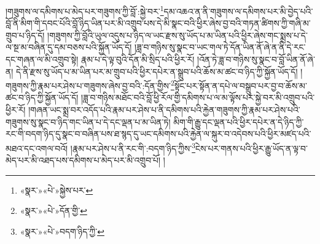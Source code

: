 །གཟུགས་ལ་དམིགས་པ་མེད་པར་གཟུགས་ཀྱི་བློ་:སྐྱེ་བར་\footnote{«སྣར་»«པེ་»སྐྱེས་པར་}དམ་འཆའ་ན་ནི་གཟུགས་ལ་དམིགས་པར་མི་བྱེད་པའི་བློ་ནི་མིག་གི་དབང་པོའི་བློ་ཉིད་ཡིན་པར་མི་འགྲུབ་པས་དེ་མི་སྣང་བའི་ཕྱིར་ཞེས་བྱ་བའི་གཏན་ཚིགས་ཀྱི་གཞི་མ་གྲུབ་པ་ཉིད་དོ། །གཟུགས་ཀྱི་བློའི་ཡུལ་འདུས་པ་ཉིད་ལ་ཡང་རྫས་སུ་ཡོད་པ་མ་ཡིན་པའི་ཕྱིར་ཞེས་གང་སྨྲས་པ་དེ་ལ་སྔ་མ་བཞིན་དུ་དམ་བཅས་པའི་སྐྱོན་ཡོད་དོ། །ཟླ་བ་གཉིས་སུ་སྣང་བ་ཡང་གལ་ཏེ་དོན་ཡིན་ནོ་ཞེ་ན་ནི་དེ་རང་དང་གཞན་ལ་མི་འགྲུབ་སྟེ། རྣམ་པ་དེ་ལྟ་བུའི་དོན་མི་སྲིད་པའི་ཕྱིར་རོ། །འོན་ཏེ་ཟླ་བ་གཉིས་སུ་སྣང་བ་བློ་ཡིན་ནོ་ཞེ་ན། དེ་ནི་རྫས་སུ་ཡོད་པ་མ་ཡིན་པར་མ་གྲུབ་པའི་ཕྱིར་དཔེར་ན་སྒྲུབ་པའི་ཆོས་མ་ཚང་བ་ཉིད་ཀྱི་སྐྱོན་ཡོད་དོ། །གཟུགས་ཀྱི་རྣམ་པར་ཤེས་པ་གཟུགས་ཞེས་བྱ་བའི་:དོན་གྱིས་\footnote{«སྣར་»«པེ་»དོན་གྱི་}སྟོང་པར་སྟོན་ན་དཔེ་ལ་བསྒྲུབ་པར་བྱ་བ་ཆོས་མ་ཚང་བ་ཉིད་ཀྱི་སྐྱོན་ཡོད་དོ། །ཟླ་བ་གཉིས་མཐོང་བའི་བློ་ཕྱི་རོལ་གྱི་དམིགས་པ་ལ་མ་ལྟོས་པར་སྐྱེ་བར་མི་འགྲུབ་པའི་ཕྱིར་རོ། །གཞན་ཡང་སྨྲ་བར་འདོད་པའི་རྣམ་པར་ཤེས་པ་ནི་དམིགས་པའི་རྐྱེན་གཟུགས་ཀྱི་རྣམ་པར་ཤེས་པའི་གཟུགས་སུ་སྣང་བ་ཉིད་གང་ཡིན་པ་དེ་དང་ལྡན་པ་མ་ཡིན་ཏེ། མིག་གི་རྒྱུ་དང་ལྡན་པའི་ཕྱིར་དཔེར་ན་དེ་ཉིད་ཀྱི་རང་གི་བདག་ཉིད་དུ་སྣང་བ་བཞིན་པས་ཐ་སྙད་དུ་ཡང་དམིགས་པའི་རྐྱེན་ལ་སྐུར་བ་འདེབས་པའི་ཕྱིར་མཛད་པའི་མཐའ་དང་འགལ་བའོ། །རྣམ་པར་ཤེས་པ་ནི་རང་གི་:བདག་ཉིད་ཀྱིས་\footnote{«སྣར་»«པེ་»བདག་ཉིད་ཀྱི་}ངེས་པར་གནས་པའི་ཕྱིར་རྒྱུ་ཡོད་ན་ལྟ་བ་མེད་པར་མི་འཐད་པས་དམིགས་པ་མེད་པར་མི་འགྲུབ་པོ། །
